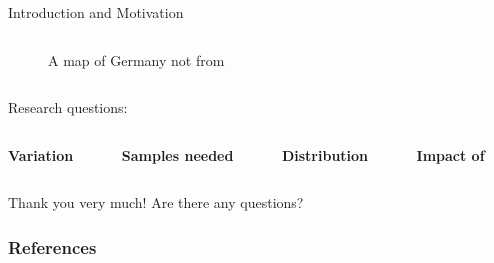 \documentclass{beamer}
\begin{document}
\begin{frame}{Introduction and Motivation}
\begin{columns}
\begin{column}{0.39\textwidth}
\begin{figure}[h!]
			\caption{A map of Germany not from \cite{Banchs2005}}
		\end{figure}    
	\end{column}
\end{columns}
\centering
Research questions:
\vfill
\begin{columns}
	\begin{column}{0.25\textwidth}
		\textbf{Variation}
	\end{column}
	\begin{column}{0.25\textwidth}
		\textbf{Samples needed}
	\end{column}
	\begin{column}{0.25\textwidth}
		\textbf{Distribution}
	\end{column}
	\begin{column}{0.25\textwidth}
		\textbf{Impact of}
	\end{column}
\end{columns}
\end{frame}


\begin{frame}{Thank you very much!}
Are there any questions? \\
\end{frame}

\begin{frame}
  \frametitle{References}
  \printbibliography[title={References}]   
\end{frame}
\end{document}
